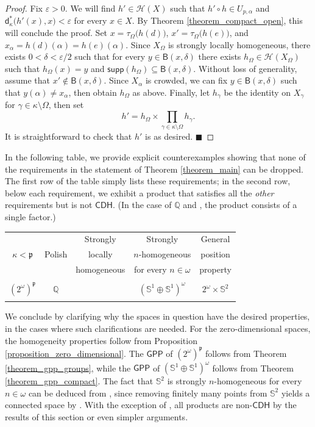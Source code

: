 \documentclass{amsart}
\theoremstyle{plain}
\theoremstyle{definition}
\newcommand{\di}{\mathsf{d}}
\newcommand{\Ball}{\mathsf{B}}
\newcommand{\supp}{\mathsf{supp}}
\newcommand{\CDH}{\mathsf{CDH}}
\newcommand{\GPP}{\mathsf{GPP}}
\newcommand{\HH}{\mathcal{H}}
\newcommand{\QQQ}{\mathbb{Q}}
\newcommand{\SSS}{\mathbb{S}}
\newcommand{\pppp}{\mathfrak{p}}
\begin{document}
\begin{proof}
Fix $\varepsilon>0$. We will find $h'\in\HH(X)$ such that $h'\circ h\in U_{p,\alpha}$ and $\di^\ast_\kappa\big(h'(x),x\big)<\varepsilon$ for every $x\in X$. By Theorem \ref{theorem_compact_open}, this will conclude the proof. Set $x=\tau_\Omega\big(h(d)\big)$, $x'=\tau_\Omega\big(h(e)\big)$, and $x_\alpha=h(d)(\alpha)=h(e)(\alpha)$. Since $X_\Omega$ is strongly locally homogeneous, there exists $0<\delta<\varepsilon/2$ such that for every $y\in\Ball(x,\delta)$ there exists $h_\Omega\in\HH(X_\Omega)$ such that $h_\Omega(x)=y$ and $\supp(h_\Omega)\subseteq\Ball(x,\delta)$. Without loss of generality, assume that $x'\notin\Ball(x,\delta)$. Since $X_\alpha$ is crowded, we can fix $y\in\Ball(x,\delta)$ such that $y(\alpha)\neq x_\alpha$, then obtain $h_\Omega$ as above. Finally, let $h_\gamma$ be the identity on $X_\gamma$ for $\gamma\in\kappa\setminus\Omega$, then set
$$
h'=h_\Omega\times\prod_{\gamma\in\kappa\setminus\Omega}h_\gamma.
$$
It is straightforward to check that $h'$ is as desired. $\blacksquare$
\end{proof}

In the following table, we provide explicit counterexamples showing that none of the requirements in the statement of Theorem \ref{theorem_main} can be dropped. The first row of the table simply lists these requirements; in the second row, below each requirement, we exhibit a product that satisfies all the \emph{other} requirements but is not $\CDH$. (In the case of $\QQQ$ and \cite[Example 1.3]{van_mill_article_2011}, the product consists of a single factor.)

\begin{center}
\begin{tabular}{c|c|c|c|c}
& & Strongly & Strongly & General \\
$\kappa<\pppp$ & Polish & locally & $n$-homogeneous & position \\
& & homogeneous & for every $n\in\omega$ & property \\\hline
& & & & \\
$(2^\omega)^\pppp$ & $\QQQ$ & \cite[Example 1.3]{van_mill_article_2011} & $(\SSS^1\oplus\SSS^1)^\omega$ & $2^\omega\times\SSS^2$\\
& & &
\end{tabular}
\end{center}

We conclude by clarifying why the spaces in question have the desired properties, in the cases where such clarifications are needed. For the zero-dimensional spaces, the homogeneity properties follow from Proposition \ref{proposition_zero_dimensional}. The $\GPP$ of $(2^\omega)^\pppp$ follows from Theorem \ref{theorem_gpp_groups}, while the $\GPP$ of $(\SSS^1\oplus\SSS^1)^\omega$ follows from Theorem \ref{theorem_gpp_compact}. The fact that $\SSS^2$ is strongly $n$-homogeneous for every $n\in\omega$ can be deduced from \cite[Theorem 3.2]{ungar}, since removing finitely many points from $\SSS^2$ yields a connected space by \cite[Corollary 3.7.3]{van_mill_book}. With the exception of \cite[Example 1.3]{van_mill_article_2011}, all products are non-$\CDH$ by the results of this section or even simpler arguments.
\end{document}
